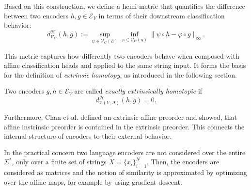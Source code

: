 Based on this construction, we define a hemi-metric that quantifies the difference between two encoders $h, g \in \mathcal{E}_V$ in terms of their downstream classification behavior:
\[
d^{\mathcal{H}}_{\mathcal{V}_C}(h, g) := \sup_{\psi \in \mathcal{V}_C(h)} \inf_{\varphi \in \mathcal{V}_C(g)} \| \psi \circ h - \varphi \circ g \|_\infty.
\]

This metric captures how differently two encoders behave when composed with affine classification heads and applied to the same string input.  
It forms the basis for the definition of \emph{extrinsic homotopy}, as introduced in the following section.


\begin{definition}
Two encoders \( g, h \in \mathcal{E}_V \) are called \emph{exactly extrinsically homotopic} if
\[
d^{\mathcal{H}}_{\mathcal{V}(V,\Delta)}(h, g) = 0.
\]
\end{definition}


Furthermore, Chan et al. \cite{chan_affine_2024} defined an extrinsic affine preorder and showed, that affine instrinsic preorder is contained in the extrinsic preorder. 
This connects the internal structure of encoders to their external behavior.

In the practical concern two language encoders are not considered over the entire $\Sigma^*$, only over a finite set of strings $X=\{x_i\}^N_{i=1}$.
Then, the encoders are considered as matrices and the notion of similarity is approximated by optimizing over the affine maps, for example by using gradient descent. 